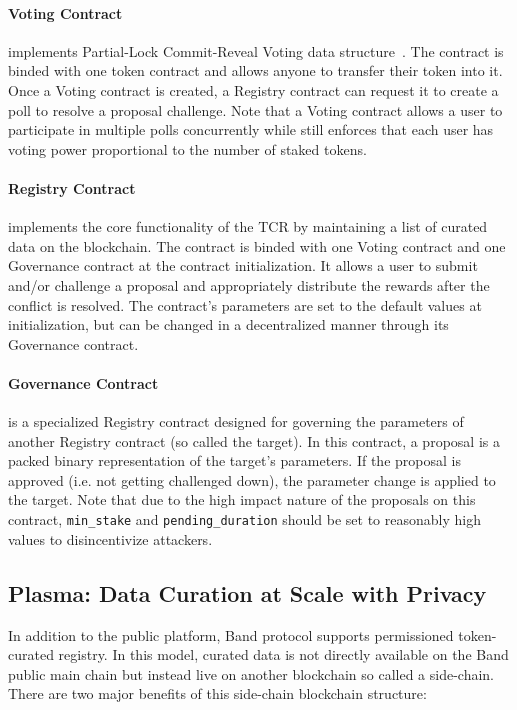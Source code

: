 \documentclass[letterpaper,11pt]{article}
\begin{document}
\paragraph{Voting Contract} implements Partial-Lock Commit-Reveal Voting data structure~\cite{plcrvoting}. The contract is binded with one token contract and allows anyone to transfer their token into it. Once a Voting contract is created, a Registry contract can request it to create a poll to resolve a proposal challenge. Note that a Voting contract allows a user to participate in multiple polls concurrently while still enforces that each user has voting power proportional to the number of staked tokens.

\paragraph{Registry Contract} implements the core functionality of the TCR by maintaining a list of curated data on the blockchain. The contract is binded with one Voting contract and one Governance contract at the contract initialization. It allows a user to submit and/or challenge a proposal and appropriately distribute the rewards after the conflict is resolved. The contract’s parameters are set to the default values at initialization, but can be changed in a decentralized manner through its Governance contract.

\paragraph{Governance Contract} is a specialized Registry contract designed for governing  the parameters of another Registry contract (so called the target). In this contract, a proposal is a packed binary representation of the target's parameters. If the proposal is approved (i.e. not getting challenged down), the parameter change is applied to the target. Note that due to the high impact nature of the proposals on this contract, {\tt min\_stake} and {\tt pending\_duration} should be set to reasonably high values to disincentivize attackers.

\subsection{Plasma: Data Curation at Scale with Privacy} \label{sec:permissioned-community}
In addition to the public platform, Band protocol supports permissioned token-curated registry. In this model, curated data is not directly available on the Band public main chain but instead live on another blockchain so called a side-chain. There are two major benefits of this side-chain blockchain structure:
\end{document}
